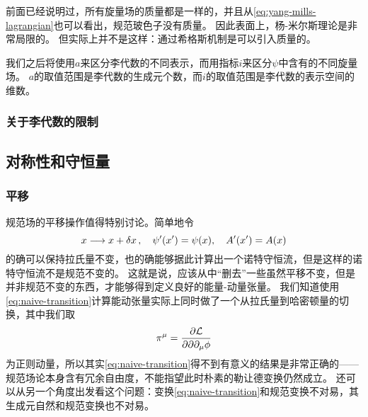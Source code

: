 \documentclass[hyperref, UTF8, a4paper]{ctexart}
\begin{document}
前面已经说明过，所有旋量场的质量都是一样的，并且从\eqref{eq:yang-mills-lagrangian}也可以看出，规范玻色子没有质量。
因此表面上，杨-米尔斯理论是非常局限的。
但实际上并不是这样：通过希格斯机制是可以引入质量的。

我们之后将使用$a$来区分李代数的不同表示，而用指标$i$来区分$\psi$中含有的不同旋量场。
$a$的取值范围是李代数的生成元个数，而$i$的取值范围是李代数的表示空间的维数。

\subsubsection{关于李代数的限制}


\subsection{对称性和守恒量}

\subsubsection{平移}\label{sec:transition}

规范场的平移操作值得特别讨论。简单地令
\begin{equation}
    x \longrightarrow x + \var{x}, \quad \psi'(x') = \psi(x), \quad A'(x') = A(x)
    \label{eq:naive-transition}
\end{equation}
的确可以保持拉氏量不变，也的确能够据此计算出一个诺特守恒流，但是这样的诺特守恒流不是规范不变的。
这就是说，应该从中“删去”一些虽然平移不变，但是并非规范不变的东西，才能够得到定义良好的能量-动量张量。
我们知道使用\eqref{eq:naive-transition}计算能动张量实际上同时做了一个从拉氏量到哈密顿量的切换，其中我们取
\[
    \pi^\mu = \pdv{\mathcal{L}}{\partial \partial_\mu \phi}
\]
为正则动量，所以其实\eqref{eq:naive-transition}得不到有意义的结果是非常正确的——规范场论本身含有冗余自由度，不能指望此时朴素的勒让德变换仍然成立。
还可以从另一个角度出发看这个问题：变换\eqref{eq:naive-transition}和规范变换不对易，其生成元自然和规范变换也不对易。
\end{document}
